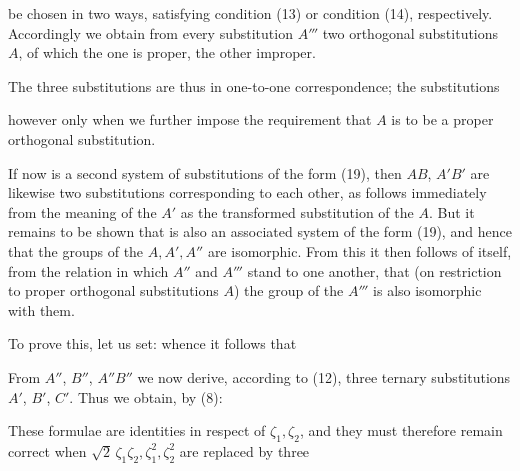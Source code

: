 be chosen in two ways, satisfying condition (13) or condition (14), respectively.
Accordingly we obtain from every substitution $A'''$ two
orthogonal substitutions $A$, of which the one is proper, the
other improper.

The three substitutions
are thus in one-to-one correspondence; the substitutions

however only when we further impose the requirement that $A$
is to be a proper orthogonal substitution.

If now
is a second system of substitutions of the form (19), then
$AB$, $A'B'$ are likewise two substitutions corresponding to each other, as
follows immediately from the meaning of the $A'$ as the transformed substitution
 of the $A$. But it remains to be shown
that
is also an associated system of the form (19), and hence that
the groups of the $A, A', A''$ are isomorphic. From this it then follows
of itself, from the relation in which $A''$ and $A'''$ stand to one
 another, that (on restriction to proper orthogonal
substitutions $A$) the group of the $A'''$ is also isomorphic with them.

To prove this, let us set:
whence it follows that

From $A''$, $B''$, $A''B''$ we now derive, according to (12), three ternary
substitutions $A'$, $B'$, $C'$. Thus we obtain, by (8):

These formulae are identities in respect of $\zeta_1, \zeta_2$, and they
must therefore remain correct when $\sqrt{2}\,\zeta_1\zeta_2, \zeta_1^2, \zeta_2^2$ are replaced by three
